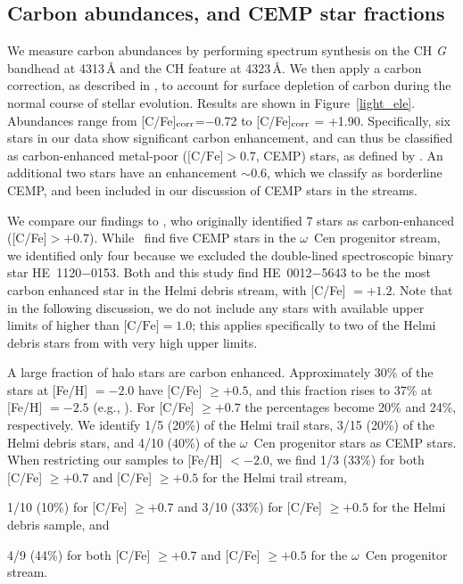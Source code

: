 \documentclass[twocolumn]{aastex63}
\begin{document}
\subsection{Carbon abundances, and CEMP star fractions}


We measure carbon abundances by performing spectrum synthesis on the CH \textit{G} bandhead at 4313\,{\AA} and the CH feature at 4323\,{\AA}. We then apply a carbon correction, as described in \citet{Placco14}, to account for surface depletion of carbon during the normal course of stellar evolution. Results are shown in Figure~\ref{light_ele}. Abundances range from [C/Fe]$_{\rm corr}$=$-$0.72 to [C/Fe]$_{\rm corr}$ = +1.90. Specifically, six stars in our data show significant carbon enhancement, and can thus be classified as carbon-enhanced metal-poor ($\mbox{[C/Fe]} > 0.7$, CEMP) stars, as defined by \citet{Aoki07}. An additional two stars have an enhancement $\sim$0.6, which we classify as borderline CEMP, and been included in our discussion of CEMP stars in the streams. 

We compare our findings to \citet{beers17}, who originally identified 7 stars as carbon-enhanced ([C/Fe]$ > +0.7$). While \citeauthor{beers17}\ find five CEMP stars in the $\omega$~Cen progenitor stream, we identified only four because we excluded the double-lined spectroscopic binary star HE~1120$-$0153. Both \citet{beers17} and this study find HE~0012$-$5643 to be the most carbon enhanced star in the Helmi debris stream, with [C/Fe] $= +1.2$. Note that in the following discussion, we do not include any stars with available upper limits of higher than $\mbox{[C/Fe]} = 1.0$; this applies specifically to two of the Helmi debris stars from \citet{Roederer10} with very high upper limits.

A large fraction of halo stars are carbon enhanced.  Approximately 30\% of the stars at [Fe/H] $= -2.0$ have [C/Fe] $\geq +0.5$, and  this fraction rises to 37\% at [Fe/H] $=-2.5$ (e.g., \citealt{Placco14}). For [C/Fe] $\geq +0.7$ the percentages become 20\% and 24\%, respectively. We identify 1/5 (20\%) of the Helmi trail stars, 3/15 (20\%) of the Helmi debris stars, and 4/10 (40\%) of the $\omega$~Cen progenitor stars as CEMP stars. 
When restricting our samples to [Fe/H] $< -2.0$, 
we find 1/3 (33\%) for both [C/Fe] $\geq +0.7$ and [C/Fe] $\geq +0.5$ for the Helmi trail stream, 

1/10 (10\%) for [C/Fe] $\geq +0.7$ and 3/10 (33\%) for [C/Fe] $\geq +0.5$ for the Helmi debris sample, and

4/9 (44\%) for both [C/Fe] $\geq +0.7$ and [C/Fe] $\geq +0.5$ for the $\omega$~Cen progenitor stream.
\end{document}
